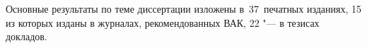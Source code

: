 {\publications} Основные результаты по теме диссертации изложены
    в~37~печатных изданиях,
    15 из которых изданы в журналах, рекомендованных ВАК,
    22 "--- в тезисах докладов.
